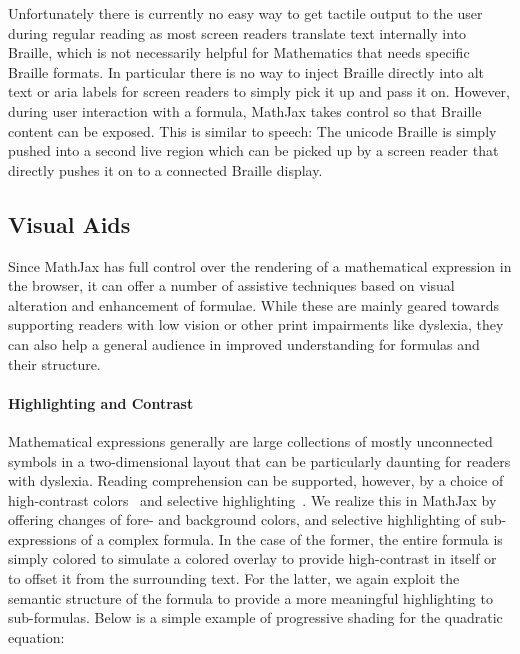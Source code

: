 \documentclass{sig-alternate}
\begin{document}
Unfortunately there is currently no easy way to get tactile output to the user
during regular reading as most screen readers translate text internally into
Braille, which is not necessarily helpful for Mathematics that needs specific
Braille formats. In particular there is no way to inject Braille directly into
alt text or aria labels for screen readers to simply pick it up and pass it on.
However, during user interaction with a formula, MathJax takes control so that
Braille content can be exposed. This is similar to speech: The unicode Braille
is simply pushed into a second live region which can be picked up by a screen
reader that directly pushes it on to a connected Braille display.



\subsection{Visual Aids}

Since MathJax has full control over the rendering of a mathematical expression
in the browser, it can offer a number of assistive techniques based on visual
alteration and enhancement of formulae. While these are mainly geared towards
supporting readers with low vision or other print impairments like dyslexia,
they can also help a general audience in improved understanding for formulas and
their structure.

\paragraph{Highlighting and Contrast}

Mathematical expressions generally are large collections of mostly unconnected
symbols in a two-dimensional layout that can be particularly daunting for
readers with dyslexia.  Reading comprehension can be supported, however, by a
choice of high-contrast colors~\cite{rello2012optimal} and selective
highlighting~\cite{jones2008strategies}. We realize this in MathJax by offering
changes of fore- and background colors, and selective highlighting of
sub-expressions of a complex formula. In the case of the former, the entire
formula is simply colored to simulate a colored overlay to provide high-contrast
in itself or to offset it from the surrounding text.  For the latter, we again
exploit the semantic structure of the formula to provide a more meaningful
highlighting to sub-formulas. Below is a simple example of progressive shading
for the quadratic equation:
\end{document}
